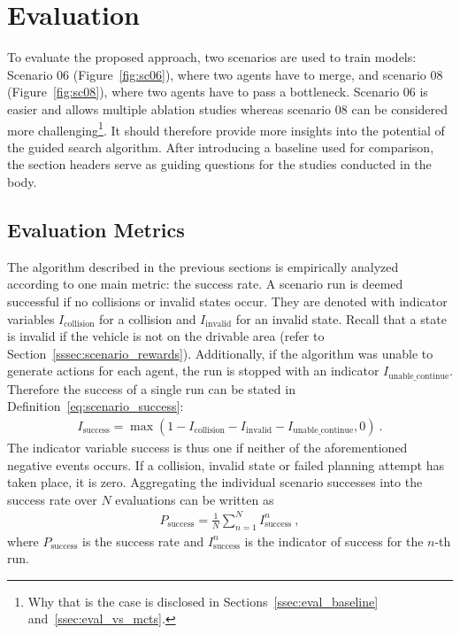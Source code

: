 \glsresetall
\section{Evaluation}\label{sec:evaluation}
To evaluate the proposed approach, two scenarios are used to train models: Scenario 06 (Figure~\ref{fig:sc06}), where two agents have to merge, and scenario 08 (Figure~\ref{fig:sc08}), where two agents have to pass a bottleneck. Scenario 06 is easier and allows multiple ablation studies whereas scenario 08 can be considered more challenging\footnote{Why that is the case is disclosed in Sections~\ref{ssec:eval_baseline} and~\ref{ssec:eval_vs_mcts}.}. It should therefore provide more insights into the potential of the guided search algorithm. After introducing a baseline used for comparison, the section headers serve as guiding questions for the studies conducted in the body.

\subsection{Evaluation Metrics}\label{ssec:evaluation_metrics}
The algorithm described in the previous sections is empirically analyzed according to one main metric: the success rate. A scenario run is deemed successful if no collisions or invalid states occur. They are denoted with indicator variables $I_{\text{collision}}$ for a collision and $I_{\text{invalid}}$ for an invalid state. Recall that a state is invalid if the vehicle is not on the drivable area (refer to Section~\ref{sssec:scenario_rewards}). Additionally, if the algorithm was unable to generate actions for each agent, the run is stopped with an indicator $I_{\text{unable\_continue}}$. Therefore the success of a single run can be stated in Definition~\ref{eq:scenario_success}:
\begin{gather}\label{eq:scenario_success}
        I_{\text{success}} = \max (1 - I_{\text{collision}} - I_{\text{invalid}} - I_{\text{unable\_continue}}, 0)~.
\end{gather}
The indicator variable success is thus one if neither of the aforementioned negative events occurs. If a collision, invalid state or failed planning attempt has taken place, it is zero. Aggregating the individual scenario successes into the success rate over $N$ evaluations can be written as
\begin{gather}
    P_{\text{success}} = \frac{1}{N} \sum_{n=1}^N I^n_{\text{success}}~,
\end{gather}
where $P_{\text{success}}$ is the success rate and $I^n_{\text{success}}$ is the indicator of success for the $n$-th run. 


